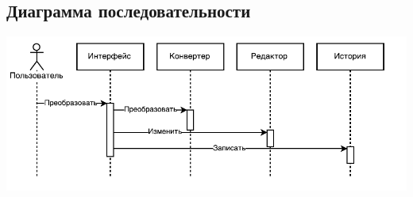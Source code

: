 \documentclass[oneside, final, 10pt]{extarticle}
\begin{document}
\subsection{Диаграмма последовательности}
\includegraphics{./uml/seq_convert}
\end{document}
